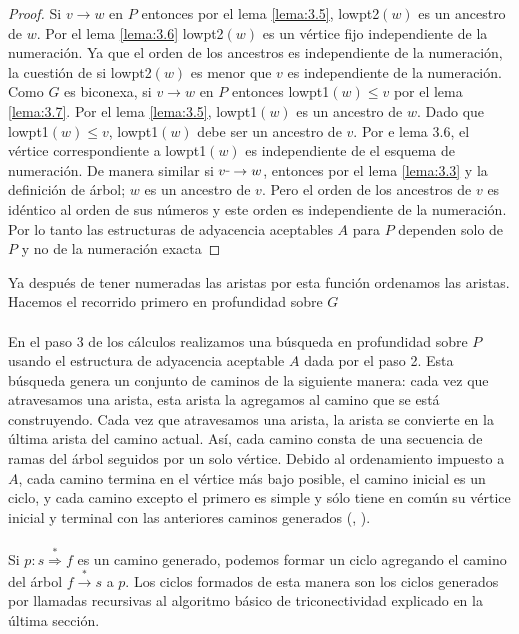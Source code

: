 \begin{proof}
Si $v \rightarrow w$ en $P$ entonces por el lema \ref{lema:3.5}, lowpt2$\left(w\right)$ es un ancestro de $w$. Por el lema \ref{lema:3.6} lowpt2$\left(w\right)$ es un vértice fijo independiente de la numeración. Ya que el orden de los ancestros es independiente de la numeración, la cuestión de si lowpt2$\left(w\right)$ es menor que $v$ es independiente de la numeración. Como $G$ es biconexa, si $v \rightarrow w$ en $P$ entonces lowpt1$\left(w\right) \leq v$ por el lema \ref{lema:3.7}. Por el lema \ref{lema:3.5}, lowpt1$\left(w\right)$ es un ancestro de $w$. Dado que lowpt1$\left(w\right) \leq v$, lowpt1$\left(w\right)$ debe ser un ancestro de $v$. Por e lema 3.6, el vértice correspondiente a lowpt1$\left(w\right)$ es independiente de el esquema de numeración. De manera similar si $v \rule[1mm]{.1cm}{0.4pt} \rightarrow w$, entonces por el lema \ref{lema:3.3} y la definición de árbol; $w$ es un ancestro de $v$. Pero el orden de los ancestros de $v$ es idéntico al orden de sus números y este orden es independiente de la numeración. Por lo tanto las estructuras de adyacencia aceptables $A$ para $P$ dependen solo de $P$ y no de la numeración exacta
\end{proof}

Ya después de tener numeradas las aristas por esta función ordenamos las aristas. Hacemos el recorrido primero en profundidad sobre $G$\\

\paragraph{}
En el paso 3 de los cálculos realizamos una búsqueda en profundidad sobre $P$ usando el estructura de adyacencia aceptable $A$ dada por el paso 2. Esta búsqueda genera un conjunto de caminos de la siguiente manera: cada vez que atravesamos una arista, esta arista la agregamos al  camino que se está construyendo. Cada vez que atravesamos una arista, la arista se convierte en la última arista del camino actual. Así, cada camino consta de una secuencia de ramas del árbol seguidos por un solo vértice. Debido al ordenamiento impuesto a $A$, cada camino termina en el vértice más bajo posible, el camino inicial es un ciclo, y cada camino excepto el primero es simple y sólo tiene en común su vértice inicial y terminal con las anteriores caminos generados (\citep{ept}, \citep{tarjan1971efficient}).

\paragraph{}
Si $p: s \overset{\ast}{\Rightarrow} f$ es un camino generado, podemos formar un ciclo agregando el camino del árbol $f \overset{\ast}{\rightarrow} s$ a $p$. Los ciclos formados de esta manera son los ciclos generados por llamadas recursivas al algoritmo básico de triconectividad explicado en la última sección.

